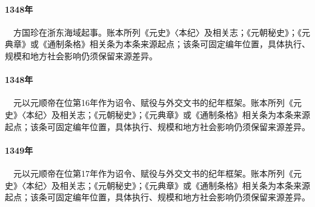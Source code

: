 \paragraph{1348年}　方国珍在浙东海域起事。账本所列《元史》〈本纪〉及相关志；《元朝秘史》；《元典章》或《通制条格》相关条为本条来源起点；该条可固定编年位置，具体执行、规模和地方社会影响仍须保留来源差异。

\paragraph{1348年}　元以元顺帝在位第16年作为诏令、赋役与外交文书的纪年框架。账本所列《元史》〈本纪〉及相关志；《元朝秘史》；《元典章》或《通制条格》相关条为本条来源起点；该条可固定编年位置，具体执行、规模和地方社会影响仍须保留来源差异。

\paragraph{1349年}　元以元顺帝在位第17年作为诏令、赋役与外交文书的纪年框架。账本所列《元史》〈本纪〉及相关志；《元朝秘史》；《元典章》或《通制条格》相关条为本条来源起点；该条可固定编年位置，具体执行、规模和地方社会影响仍须保留来源差异。
